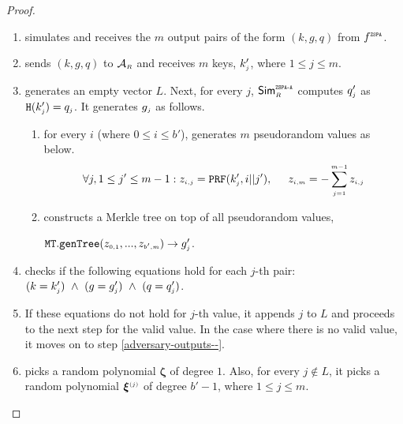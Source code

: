\begin{proof}
\begin{enumerate}
%
\item simulates  \zspa and receives the $m$ output pairs of the form $( k,  g,  q) $ from $f^{\scriptscriptstyle \mathtt{ZSPA}}$.
%
\item sends $( k,  g,  q) $ to $\mathcal{A}_{\scriptscriptstyle R}$ and receives $m$ keys, $ k'_{\scriptscriptstyle j}$, where $1\leq j \leq m$. 
%
\item\label{ZSPA-A-Case-2-generate-z} generates an empty vector $ L$. Next, for every $j$, $\mathsf{Sim}^{\scriptscriptstyle \mathtt{ZSPA\text{-}A}}_{\scriptscriptstyle R}$ computes $q'_{\scriptscriptstyle j}$ as $\mathtt {H}( k'_{\scriptscriptstyle j})=q_{\scriptscriptstyle j}$.  It generates $g_{\scriptscriptstyle j}$ as follows. 


\begin{enumerate}

\item\label{gen-pr-vals} for every $i$ (where $0\leq i \leq b'$), generates $m$ pseudorandom values as below. 
%
 $$\forall j, 1\leq j' \leq m-1: z_{\scriptscriptstyle i,j}=\mathtt{PRF}( k'_{\scriptscriptstyle j},i||j'), \hspace{5mm} z_{\scriptscriptstyle i,m}=-\sum\limits^{\scriptscriptstyle m-1}_{\scriptscriptstyle j=1}z_{\scriptscriptstyle i,j}$$
%
\item   constructs a Merkle tree on top of all pseudorandom values,  

$\mathtt{MT.genTree}(z_{\scriptscriptstyle 0,1},...,z_{\scriptscriptstyle b', m})\rightarrow  g'_{\scriptscriptstyle j}$. 
%
\end{enumerate}
%
\item checks if the following equations hold for each $j$-th pair: 
%
$( k=    k'_{\scriptscriptstyle j}) \ \wedge\  ( g=   g'_{\scriptscriptstyle j})  \ \wedge\ ( q=  q'_{\scriptscriptstyle j})$.
%
%
\item If these equations do not hold for $j$-th value, it appends $j$ to $ L$ and proceeds to the next step for the valid value. In the case where there is no valid value, it moves on to step \ref{adversary-outputs--}. 


\item picks a random polynomial ${\bm \zeta}$ of degree $1$. Also, for every $j\notin  L$, it picks a random polynomial ${\bm\xi}^{\scriptscriptstyle (j)}$ of degree $b'-1$, where $1\leq j \leq m$. 
%


\end{enumerate}
\end{proof}
